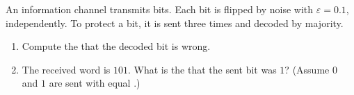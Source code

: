 \begin{exercise}[$\star\star\star$]\label{exo:g12:condprob:8}
An information channel transmits bits. Each bit is flipped by noise with
 $\varepsilon = 0.1$, independently. To protect a bit, it is sent
three times and decoded by majority.
\begin{enumerate}
  \item Compute the  that the decoded bit is wrong.
  \item The received word is $101$. What is the  that the sent
        bit was $1$? (Assume $0$ and $1$ are sent with equal .)
\end{enumerate}
\end{exercise}

